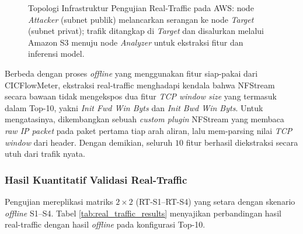 \documentclass[11pt, a4paper]{article}
\begin{document}
\begin{figure}[htbp]
{%
}
\vspace{0.2cm}
\caption{Topologi Infrastruktur Pengujian Real-Traffic pada AWS: node \textit{Attacker} (subnet publik) melancarkan serangan ke node \textit{Target} (subnet privat); trafik ditangkap di \textit{Target} dan disalurkan melalui Amazon S3 menuju node \textit{Analyzer} untuk ekstraksi fitur dan inferensi model.}
\label{fig:aws_infra}
\end{figure}

Berbeda dengan proses \textit{offline} yang menggunakan fitur siap-pakai dari CICFlowMeter, ekstraksi real-traffic menghadapi kendala bahwa NFStream secara bawaan tidak mengekspos dua fitur \textit{TCP window size} yang termasuk dalam Top-10, yakni \textit{Init Fwd Win Byts} dan \textit{Init Bwd Win Byts}. Untuk mengatasinya, dikembangkan sebuah \textit{custom plugin} NFStream yang membaca \textit{raw IP packet} pada paket pertama tiap arah aliran, lalu mem-parsing nilai \textit{TCP window} dari header. Dengan demikian, seluruh $10$ fitur berhasil diekstraksi secara utuh dari trafik nyata.

\subsubsection{Hasil Kuantitatif Validasi Real-Traffic}
Pengujian mereplikasi matriks $2\times 2$ (RT-S1--RT-S4) yang setara dengan skenario \textit{offline} S1--S4. Tabel \ref{tab:real_traffic_results} menyajikan perbandingan hasil real-traffic dengan hasil \textit{offline} pada konfigurasi Top-10.
\end{document}
